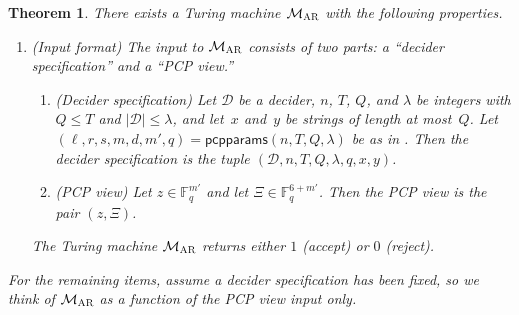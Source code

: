 \documentclass[11pt]{article}
\newtheorem{theorem}{Theorem}[section]
\theoremstyle{definition}
\newcommand{\F}{\ensuremath{\mathbb{F}}}
\newcommand{\decider}{\mathcal{D}}
\newcommand{\gamestyle}[1]{\ensuremath{\textsc{#1}}\xspace}
\newcommand{\ar}{\gamestyle{AR}}
\newcommand{\pcpparams}{\mathsf{pcpparams}}
\newcommand{\pcpeval}{\Xi}
\newcommand{\pcpverifier}{\mathcal{M}_\ar}
\newcommand{\qlen}{Q}
\begin{document}
\begin{theorem}\label{thm:pcp-decider}
  There exists a Turing machine $\pcpverifier$ with the following properties.
  \begin{enumerate}
  \item \emph{(Input format)} The input to $\pcpverifier$ consists of two parts:
    a ``decider specification'' and a ``PCP view.''
    \begin{enumerate}
    \item \emph{(Decider specification)} Let $\decider$ be a decider, $n$, $T$,
      $\qlen$, and $\lambda$ be integers with $\qlen \leq T$ and $|\decider|
      \leq \lambda$, and let~$x$ and~$y$ be strings of length at most~$\qlen$.
      Let $(\ell, r, s, m, d, m',q) = \pcpparams(n, T, \qlen,\lambda)$ be as in
      .
      Then the decider specification is the tuple $(\decider, n, T, \qlen,
      \lambda, q, x, y)$.
    \item \emph{(PCP view)} Let $z \in \F_{q}^{m'}$ and let $\pcpeval \in
      \F_q^{6 + m'}$.
      Then the PCP view is the pair $(z, \pcpeval)$.
    \end{enumerate}
    The Turing machine $\pcpverifier$ returns either $1$ (accept) or $0$
    (reject).
  \end{enumerate}
  For the remaining items, assume a decider specification has been fixed, so we
  think of $\pcpverifier$ as a function of the PCP view input only.


\end{theorem}
\end{document}
